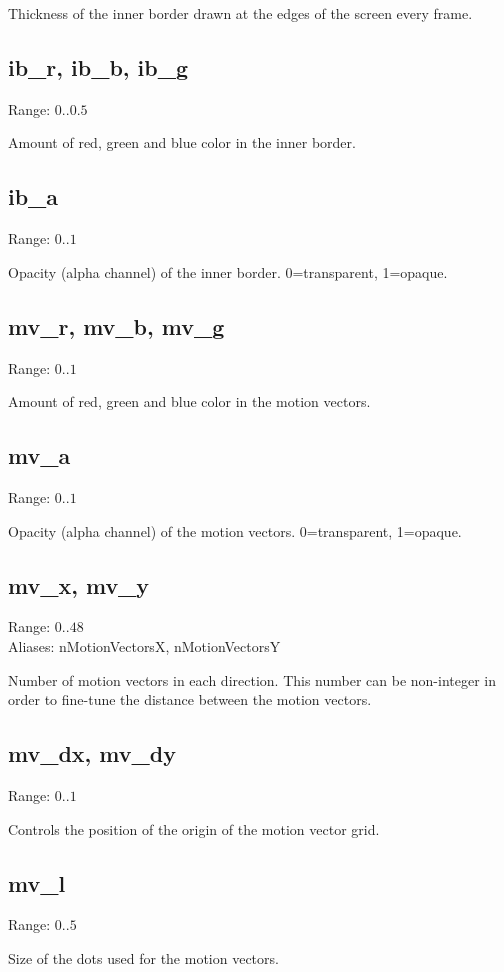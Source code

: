 \documentclass[11pt, a5paper, pagesize]{scrbook}
\begin{document}
Thickness of the inner border drawn at the edges of the screen every frame.

\subsection{ib\_r, ib\_b, ib\_g}
Range: $0..0.5$

Amount of red, green and blue color in the inner border.

\subsection{ib\_a}
Range: $0..1$

Opacity (alpha channel) of the inner border. 0=transparent, 1=opaque.

\subsection{mv\_r, mv\_b, mv\_g}
Range: $0..1$

Amount of red, green and blue color in the motion vectors.

\subsection{mv\_a}
Range: $0..1$

Opacity (alpha channel) of the motion vectors. 0=transparent, 1=opaque.

\subsection{mv\_x, mv\_y}
Range: $0..48$\\
Aliases: nMotionVectorsX, nMotionVectorsY

Number of motion vectors in each direction. This number can be non-integer in order to fine-tune the distance between the motion vectors.

\subsection{mv\_dx, mv\_dy}
Range: $0..1$

Controls the position of the origin of the motion vector grid.

\subsection{mv\_l}
Range: $0..5$

Size of the dots used for the motion vectors.
\end{document}
